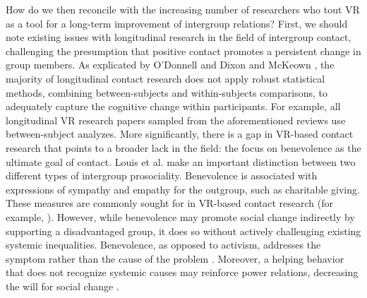 \documentclass[dissertation,math,vertlayout,pdfa,colorlinks]{aaltoseries}
\begin{document}
How do we then reconcile with the increasing number of researchers who tout VR as a tool for a long-term improvement of intergroup relations? First, we should note existing issues with longitudinal research in the field of intergroup contact, challenging the presumption that positive contact promotes a persistent change in group members. As explicated by O'Donnell \cite{odonnellTechnologicalAnalyticalAdvancements2021} and Dixon and McKeown \cite{dixonNegativeContactCollective2021}, the majority of longitudinal contact research does not apply robust statistical methods, combining between-subjects and within-subjects comparisons, to adequately capture the cognitive change within participants. For example, all longitudinal VR research papers sampled from the aforementioned reviews \cite{herreraBuildingLongtermEmpathy2018,loonVirtualRealityPerspectivetaking2018,hassonEnemysGazeImmersive2019} use between-subject analyzes. More significantly, there is a gap in VR-based contact research that points to a broader lack in the field: the focus on benevolence as the ultimate goal of contact. Louis et al. \cite{louisEmergingResearchIntergroup2019} make an important distinction between two different types of intergroup prosociality. Benevolence is associated with expressions of sympathy and empathy for the outgroup, such as charitable giving. These measures are commonly sought for in VR-based contact research (for example, \cite{loonVirtualRealityPerspectivetaking2018,derricoProsocialVirtualReality2020, branhamVirtualImmersiveContact2024}). However, while benevolence may promote social change indirectly by supporting a disadvantaged group, it does so without actively challenging existing systemic inequalities. Benevolence, as opposed to activism, addresses the symptom rather than the cause of the problem \cite{louisEmergingResearchIntergroup2019}. Moreover, a helping behavior that does not recognize systemic causes may reinforce power relations, decreasing the will for social change \cite{nadlerInterGroupHelping2002}. 
\end{document}
